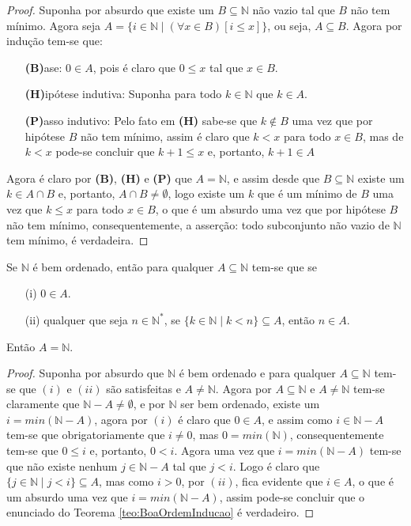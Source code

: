 \begin{proof}
	Suponha por absurdo que existe um  $B \subseteq \mathbb{N}$ não vazio tal que $B$ não tem mínimo. Agora seja $A = \{i \in \mathbb{N} \mid (\forall x \in B)[i \leq x]\}$, ou seja, $A \subseteq B$. Agora por indução tem-se que:
	\begin{itemize}
		\item[ ] \textbf{(B)}ase: $0 \in A$, pois é claro que $0 \leq x$ tal que $x \in B$.
		\item[ ] \textbf{(H)}ipótese indutiva:  Suponha para todo $k \in \mathbb{N}$ que $k \in A$.
		\item[ ] \textbf{(P)}asso indutivo:  Pelo fato em \textbf{(H)} sabe-se que $k \notin B$ uma vez que por hipótese $B$ não tem mínimo, assim é claro que $k < x$ para todo $x \in B$, mas de $k < x$ pode-se concluir que $k + 1 \leq x$ e, portanto, $k+1 \in A$
	\end{itemize}
	Agora é claro por \textbf{(B)}, \textbf{(H)} e \textbf{(P)} que $A = \mathbb{N}$, e assim desde que $B \subseteq \mathbb{N}$ existe um $k \in A \cap B$ e, portanto, $A \cap B \neq \emptyset$, logo existe um $k$ que é um mínimo de $B$ uma vez que $k \leq x$ para todo $x \in B$, o que é um absurdo uma vez que por hipótese $B$ não tem mínimo, consequentemente, a asserção: todo subconjunto não vazio de $\mathbb{N}$ tem mínimo, é verdadeira.
\end{proof}

\begin{teorema}\label{teo:BoaOrdemInducao}
	Se $\mathbb{N}$ é bem ordenado, então para qualquer $A \subseteq \mathbb{N}$ tem-se que se
	\begin{itemize}
		\item[(i)] $0 \in A$.
		\item[(ii)] qualquer que seja $n \in \mathbb{N}^*$, se $\{k \in \mathbb{N} \mid k < n\} \subseteq A$, então $n \in A$.
	\end{itemize}
	Então $A = \mathbb{N}$.
\end{teorema}

\begin{proof}
	Suponha por absurdo que $\mathbb{N}$ é bem ordenado e para qualquer $A \subseteq \mathbb{N}$ tem-se que $(i)$ e $(ii)$ são satisfeitas e $A \neq \mathbb{N}$. Agora por $A \subseteq \mathbb{N}$ e $A \neq \mathbb{N}$ tem-se claramente que $\mathbb{N} - A \neq \emptyset$, e por  $\mathbb{N}$ ser bem ordenado, existe um $i = min(\mathbb{N} - A)$, agora por $(i)$ é claro que $0 \in A$, e assim como $i \in \mathbb{N} - A$ tem-se que obrigatoriamente que $i \neq 0$, mas $0 = min(\mathbb{N})$, consequentemente tem-se que $0 \leq i$ e, portanto, $0 < i$. Agora uma vez que $i = min(\mathbb{N} - A)$ tem-se que não existe nenhum $j \in \mathbb{N} - A$ tal que $j < i$. Logo é claro que $\{j \in \mathbb{N} \mid j < i\} \subseteq A$, mas como $i > 0$, por $(ii)$, fica evidente que $i \in A$, o que é um absurdo uma vez que $i = min(\mathbb{N} - A)$, assim pode-se concluir que o enunciado do Teorema \ref{teo:BoaOrdemInducao} é verdadeiro.
\end{proof}

